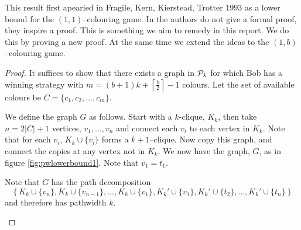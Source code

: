 This result first apearied in Fragile, Kern, Kierstead, Trotter 1993 \cite{faKeKiTr1993} as a lower bound for the $(1,1)$--colouring game. In \cite{faKeKiTr1993} the authors do not give a formal proof, they inspire a proof. This is something we aim to remedy in this report. We do this by proving a new proof. At the same time we  extend the ideas to the $(1,b)$--colouring game.
\begin{proof}
    It suffices to show that there exists a graph in $\mathcal{P}_k$ for which Bob has a winning strategy with $m=(b+1)k+\left\lceil\frac{b}{2}\right\rceil-1$ colours. Let the set of available colours be $C=\{c_1,c_2,\dots,c_m\}$.
    
    We define the graph $G$ as follows. Start with a $k$-clique, $K_k$, then take $n=2|C|+1$ vertices, $v_1,\dots,v_n$ and connect each $v_i$ to each vertex in $K_k$. Note that for each $v_i$, $K_k\cup\{v_i\}$ forms a $k+1$--clique. Now copy this graph, and connect the copies at any vertex not in $K_k$. We now have the graph, $G$, as in figure \ref{fig:pwlowerbound1}. Note that $v_1=t_1$. 
    
    Note that $G$ has the path decomposition \[\left\{K_k\cup\{v_n\}, K_k\cup\{v_{n-1}\}, \dots, K_k\cup\{v_1\}, K_k'\cup\{v_1\}, K_k'\cup\{t_2\}, \dots, K_k'\cup\{t_n\}\right\}\] and therefore has pathwidth $k$.
\begin{figure}[H]
    \centering
{}
\end{figure}
\end{proof}
